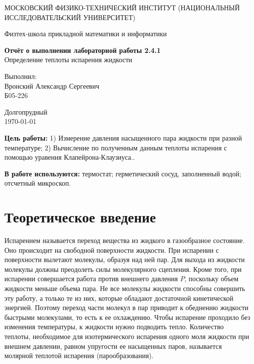 \documentclass[a4paper,12pt]{article}
\date{\today}
\begin{document}
\begin{titlepage}
	\begin{center}
		{\large МОСКОВСКИЙ ФИЗИКО-ТЕХНИЧЕСКИЙ ИНСТИТУТ (НАЦИОНАЛЬНЫЙ ИССЛЕДОВАТЕЛЬСКИЙ УНИВЕРСИТЕТ)}
	\end{center}
	\begin{center}
		{\large Физтех-школа прикладной математики и информатики}
	\end{center}


	\vspace{4.5cm}
	{\huge
		\begin{center}
			{\bf Отчёт о выполнении лабораторной работы 2.4.1}\\
      Определение теплоты испарения жидкости
		\end{center}
	}
	\vspace{2cm}
	\begin{flushright}
		{\LARGE Выполнил:\\ Вронский Александр Сергеевич \\
			\vspace{0.2cm}
			Б05-226}
	\end{flushright}
	\vspace{8cm}
	\begin{center}
		Долгопрудный\\
		\today
	\end{center}
\end{titlepage}

\textbf{Цель работы:} 1) Измерение давления насыщенного пара жидкости при разной температуре; 2) Вычисление по полученным данным теплоты испарения с помощью уравения Клапейрона-Клаузиуса..

\textbf{В работе используются:} термостат; герметический сосуд, заполненный водой; отсчетный микроскоп.

\section{Теоретическое введение}

  Испарением называется переход вещества из жидкого в газообразное состояние. Оно происходит на свободной поверхности жидкости. При испарении с поверхности вылетают молекулы, образуя над ней пар. Для выхода из жидкости молекулы должны преодолеть силы молекулярного сцепления. Кроме того, при испарении совершается работа против внешнего давления $P$, поскольку объем жидкости меньше объема пара. Не все молекулы жидкости способны совершить эту работу, а только те из них, которые обладают достаточной кинетической энергией. Поэтому переход части молекул в пар приводит к обеднению жидкости быстрыми молекулами, то есть к ее охлаждению. Чтобы испарение проходило без изменения температуры, к жидкости нужно подводить тепло. Количество теплоты, необходимое для изотермического испарения одного моля жидкости при внешнем давлении, равном упругости ее насыщенных паров, называется молярной теплотой испарения (парообразования).
\end{document}
